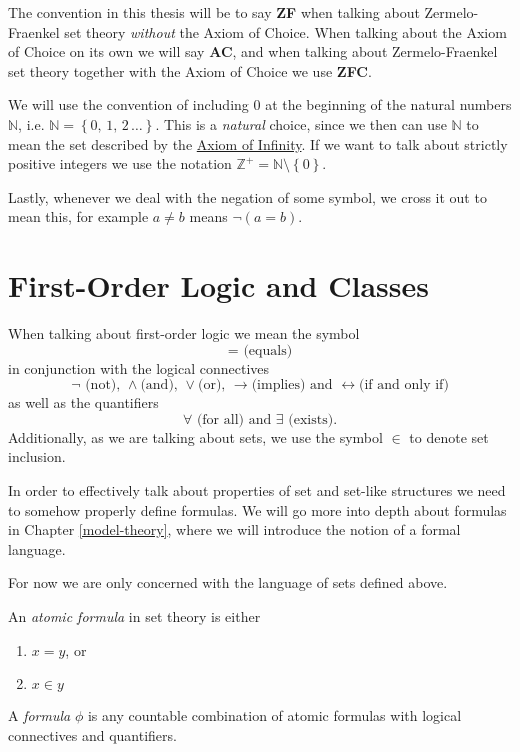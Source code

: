 \documentclass[../../main.tex]{subfiles}
\begin{document}
The convention in this thesis will be to say \textbf{ZF} when talking about Zermelo-Fraenkel set theory \textit{without} the Axiom of Choice.
When talking about the Axiom of Choice on its own we will say \textbf{AC}, and when talking about Zermelo-Fraenkel set theory together with the Axiom of Choice we use \textbf{ZFC}.

We will use the convention of including $0$ at the beginning of the natural numbers $\mathbb{N}$, i.e. $\mathbb{N} = \left\{0, \, 1, \, 2\, \ldots\right\}$.
This is a \textit{natural} choice, since we then can use $\mathbb{N}$ to mean the set described by the \hyperref[ZF7]{Axiom of Infinity}.
If we want to talk about strictly positive integers we use the notation $\mathbb{Z}^+ = \mathbb{N}\setminus\left\{0\right\}$.

Lastly, whenever we deal with the negation of some symbol, we cross it out to mean this, for example $a \neq b$ means $\lnot \left(a = b\right)$.

\section{First-Order Logic and Classes}
When talking about first-order logic we mean the symbol $$= \text{ (equals)}$$ in conjunction with the logical connectives
$$\lnot \text{ (not), } \wedge \text{(and), } \vee \text{(or), } \rightarrow \text{(implies) and } \leftrightarrow \text{(if and only if)}$$
as well as the quantifiers $$\forall \text{ (for all) and } \exists \text{ (exists)}.$$
Additionally, as we are talking about sets, we use the symbol $\in$ to denote set inclusion. \cite[pp.2-3]{Jec78}

In order to effectively talk about properties of set and set-like structures we need to somehow properly define formulas.
We will go more into depth about formulas in Chapter \ref{model-theory}, where we will introduce the notion of a formal language.

For now we are only concerned with the language of sets defined above.

\begin{definition}
    An \textit{atomic formula} in set theory is either
    \begin{enumerate}
        \item $x = y$, or
        \item $x \in y$
    \end{enumerate}
    A \textit{formula} $\phi$ is any countable combination of atomic formulas with logical connectives and quantifiers.
\end{definition}
\end{document}
